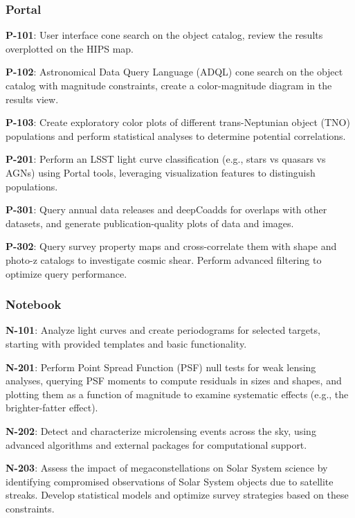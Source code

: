 
\subsubsection{Portal}

\textbf{P-101}: User interface cone search on the object catalog, review the results overplotted on the HIPS map.

\textbf{P-102}: Astronomical Data Query Language (ADQL) cone search on the object catalog with magnitude constraints, create a color-magnitude diagram in the results view.

\textbf{P-103}: Create exploratory color plots of different trans-Neptunian object (TNO) populations and perform statistical analyses to determine potential correlations. 

\textbf{P-201}: Perform an LSST light curve classification (e.g., stars vs quasars vs AGNs) using Portal tools, leveraging visualization features to distinguish populations.

\textbf{P-301}: Query annual data releases and deepCoadds for overlaps with other datasets, and generate publication-quality plots of data and images.

\textbf{P-302}: Query survey property maps and cross-correlate them with shape and photo-z catalogs to investigate cosmic shear. Perform advanced filtering to optimize query performance.

\subsubsection{Notebook}

\textbf{N-101}:  Analyze light curves and create periodograms for selected targets, starting with provided templates and basic functionality.

\textbf{N-201}: Perform Point Spread Function (PSF) null tests for weak lensing analyses, querying PSF moments to compute residuals in sizes and shapes, and plotting them as a function of magnitude to examine systematic effects (e.g., the brighter-fatter effect).

\textbf{N-202}: Detect and characterize microlensing events across the sky, using advanced algorithms and external packages for computational support.

\textbf{N-203}: Assess the impact of megaconstellations on Solar System science by identifying compromised observations of Solar System objects due to satellite streaks.
Develop statistical models and optimize survey strategies based on these constraints. 

